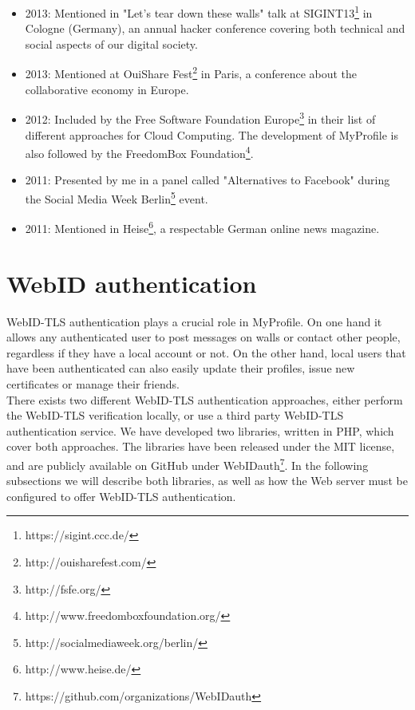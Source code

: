 \begin{itemize}
\item 2013: Mentioned in "Let's tear down these walls" talk at SIGINT13\footnote{https://sigint.ccc.de/} in Cologne (Germany), an annual hacker conference covering both technical and social aspects of our digital society.

\item 2013: Mentioned at OuiShare Fest\footnote{http://ouisharefest.com/} in Paris, a conference about the collaborative economy in Europe.

\item 2012: Included by the Free Software Foundation Europe\footnote{http://fsfe.org/} in their list of different approaches for Cloud Computing. The development of MyProfile is also followed by the FreedomBox Foundation\footnote{http://www.freedomboxfoundation.org/}.

\item 2011: Presented by me in a panel called "Alternatives to Facebook" during the Social Media Week Berlin\footnote{http://socialmediaweek.org/berlin/} event.

\item 2011: Mentioned in Heise\footnote{http://www.heise.de/}, a respectable German online news magazine.
\end{itemize}


\section{WebID authentication}
WebID-TLS authentication plays a crucial role in MyProfile. On one hand it allows any authenticated user to post messages on walls or contact other people, regardless if they have a local account or not. On the other hand, local users that have been authenticated can also easily update their profiles, issue new certificates or manage their friends.\\

There exists two different WebID-TLS authentication approaches, either perform the WebID-TLS verification locally, or use a third party WebID-TLS authentication service. We have developed two libraries, written in PHP, which cover both approaches. The libraries have been released under the MIT license, and are publicly available on GitHub under WebIDauth\footnote{https://github.com/organizations/WebIDauth}. In the following subsections we will describe both libraries, as well as how the Web server must be configured to offer WebID-TLS authentication. 

